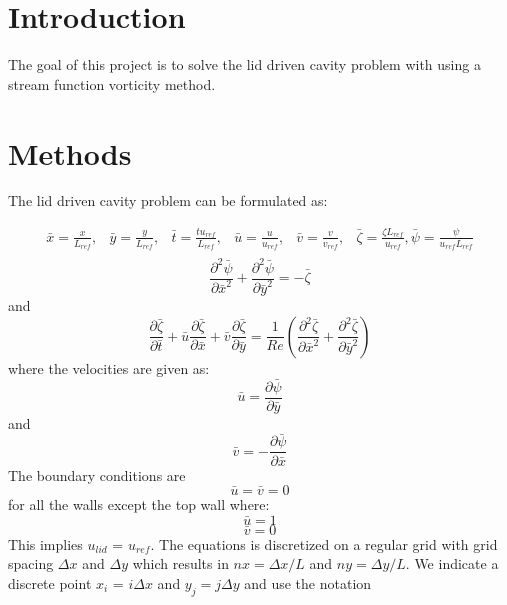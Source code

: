 \section{Introduction}
%
The goal of this project is to solve the lid driven cavity problem with using a stream function vorticity method. 

\section{Methods}
%
The lid driven cavity problem can be formulated as:

\begin{align*}
\bar{x} = \frac{x}{L_{ref}}, & \bar{y} = \frac{y}{L_{ref}}, & \bar{t}= \frac{t u_{ref}}{L_{ref}} , & \bar{u}=\frac{u}{u_{ref}} , & \bar{v}=\frac{v}{v_{ref}},& \bar{\zeta} = \frac{\zeta L_{ref}}{u_{ref}}, \bar{\psi} = \frac{\psi}{u_{ref} L_{ref}} \\
\end{align*}
\begin{equation}
\frac{\partial^2 \bar{\psi}}{\partial \bar{x}^2} + \frac{\partial^2 \bar{\psi}}{\partial \bar{y}^2}=-\bar{\zeta}
\end{equation}
and
\begin{equation}
\frac{\partial \bar{\zeta}}{\partial \bar{t}} + \bar{u} \frac{\partial \bar{\zeta}}{\partial \bar{x}} + \bar{v} \frac{\partial \bar{\zeta}}{\partial \bar{y}} = \frac{1}{Re} \left( \frac{\partial^2 \bar{\zeta}}{\partial \bar{x}^2} + \frac{\partial^2 \bar{\zeta}}{\partial \bar{y}^2} \right)
\end{equation}
where the velocities are given as:
\begin{equation}
\bar{u} = \frac{\partial \bar{\psi}}{\partial \bar{y}}
\end{equation}
and
\begin{equation}
\bar{v} = -\frac{\partial \bar{\psi}}{\partial \bar{x}}
\end{equation}
The boundary conditions are 
\begin{equation}
\bar{u} = \bar{v} = 0
\end{equation}
for all the walls except the top wall where:
\begin{equation}
\bar{u} = 1 
\end{equation}
\begin{equation}
\bar{v} = 0
\end{equation}
This implies $u_{lid}$ = $u_{ref}$. The equations is discretized on a regular grid with grid spacing $\Delta x$ and $\Delta y$ which results in $nx = \Delta x /L $ and $ny = \Delta y / L$. We indicate a discrete point $x_i$ = $i \Delta x$ and $y_j = j \Delta y$  and use the notation
